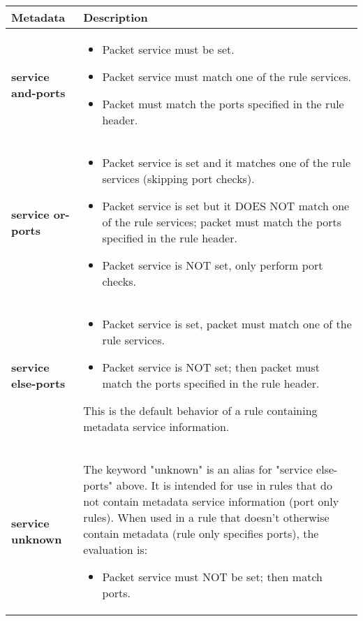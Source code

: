 \documentclass[english]{report}
\begin{document}
\begin{longtable}{| p{1.5in} | p{4.5in} |}
\hline
{\bf Metadata} & {\bf Description}\\
\hline

\hline
\textbf{service and-ports} &
\begin{itemize}
\item{Packet service must be set.}
\item{Packet service must match one of the rule services.}
\item{Packet must match the ports specified in the rule header.}
\end{itemize} \\

\hline
\textbf{service or-ports} &
\begin{itemize}
\item{Packet service is set and it matches one of the rule services (skipping port checks).}
\item{Packet service is set but it DOES NOT match one of the rule services; packet must match the ports specified in the rule header.}
\item{Packet service is NOT set, only perform port checks.}
\end{itemize} \\

\hline
\textbf{service else-ports} &
\begin{itemize}
\item{Packet service is set, packet must match one of the rule services.}
\item{Packet service is NOT set; then packet must match the ports specified in the rule header.}
\end{itemize}

This is the default behavior of a rule containing metadata service information. \\

\hline
\textbf{service unknown} &

The keyword "unknown" is an alias for "service else-ports" above. It is intended
for use in rules that do not contain metadata service information (port only
rules). When used in a rule that doesn't otherwise contain metadata (rule only
specifies ports), the evaluation is:

\begin{itemize}
\item{Packet service must NOT be set; then match ports.}
\end{itemize} \\

\hline
\end{longtable}
\end{document}
